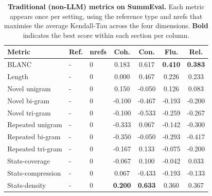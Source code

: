 \begin{table}[h!]
\vspace{1em}

\begin{subtable}[t]{\textwidth}
\centering
\begin{tabular}{lllcccc}
\toprule
\textbf{Metric} & \textbf{Ref.} & \textbf{nrefs}
  & \textbf{Coh.} & \textbf{Con.} & \textbf{Flu.} & \textbf{Rel.} \\
\midrule
\rowcolor{reffree}
BLANC & - & 0 & 0.183 & 0.617 & \textbf{0.410} & \textbf{0.383} \\
\rowcolor{reffree}
Length & - & 0 & 0.000 & 0.467 & 0.226 & 0.233 \\
\rowcolor{reffree}
Novel unigram & - & 0 & 0.150 & -0.050 & 0.126 & 0.083 \\
\rowcolor{reffree}
Novel bi-gram & - & 0 & -0.100 & -0.467 & -0.193 & -0.200 \\
\rowcolor{reffree}
Novel tri-gram & - & 0 & -0.100 & -0.533 & -0.259 & -0.267 \\
\rowcolor{reffree}
Repeated unigram & - & 0 & -0.333 & 0.067 & -0.142 & -0.300 \\
\rowcolor{reffree}
Repeated bi-gram & - & 0 & -0.350 & -0.050 & -0.293 & -0.417 \\
\rowcolor{reffree}
Repeated tri-gram & - & 0 & -0.167 & 0.133 & -0.075 & -0.200 \\
\rowcolor{reffree}
Stats-coverage & - & 0 & -0.067 & 0.100 & -0.042 & 0.033 \\
\rowcolor{reffree}
Stats-compression & - & 0 & 0.067 & -0.433 & -0.193 & -0.133 \\
\rowcolor{reffree}
Stats-density & - & 0 & \textbf{0.200} & \textbf{0.633} & 0.360 & 0.367 \\
\bottomrule
\end{tabular}
\caption{Reference-free: nrefs\,=\,0.}
\label{tab:traditional_metrics-reffree}
\end{subtable}
\caption{%
  \textbf{Traditional (non-LLM) metrics on SummEval.}
  Each metric appears once per setting, using the reference type and nrefs that
  maximise the average Kendall-Tau across the four dimensions.
  \textbf{Bold} indicates the best score within each section per column.
}
\label{tab:traditional_metrics}
\end{table}